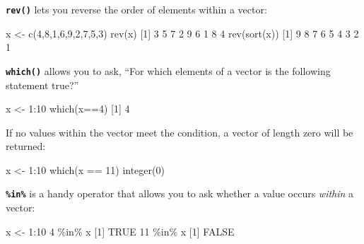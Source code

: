 \documentclass[
]{book}
\newenvironment{Shaded}{\begin{snugshade}}{\end{snugshade}}
\newcommand{\ConstantTok}[1]{\textcolor[rgb]{0.00,0.00,0.00}{#1}}
\newcommand{\DecValTok}[1]{\textcolor[rgb]{0.00,0.00,0.81}{#1}}
\newcommand{\FunctionTok}[1]{\textcolor[rgb]{0.00,0.00,0.00}{#1}}
\newcommand{\NormalTok}[1]{#1}
\newcommand{\OtherTok}[1]{\textcolor[rgb]{0.56,0.35,0.01}{#1}}
\newcommand{\SpecialCharTok}[1]{\textcolor[rgb]{0.00,0.00,0.00}{#1}}
\begin{document}
\textbf{\texttt{rev()}} lets you reverse the order of elements within a vector:

\begin{Shaded}
\begin{Highlighting}[]
\NormalTok{x }\OtherTok{\textless{}{-}} \FunctionTok{c}\NormalTok{(}\DecValTok{4}\NormalTok{,}\DecValTok{8}\NormalTok{,}\DecValTok{1}\NormalTok{,}\DecValTok{6}\NormalTok{,}\DecValTok{9}\NormalTok{,}\DecValTok{2}\NormalTok{,}\DecValTok{7}\NormalTok{,}\DecValTok{5}\NormalTok{,}\DecValTok{3}\NormalTok{)}
\FunctionTok{rev}\NormalTok{(x)}
\NormalTok{[}\DecValTok{1}\NormalTok{] }\DecValTok{3} \DecValTok{5} \DecValTok{7} \DecValTok{2} \DecValTok{9} \DecValTok{6} \DecValTok{1} \DecValTok{8} \DecValTok{4}
\FunctionTok{rev}\NormalTok{(}\FunctionTok{sort}\NormalTok{(x))}
\NormalTok{[}\DecValTok{1}\NormalTok{] }\DecValTok{9} \DecValTok{8} \DecValTok{7} \DecValTok{6} \DecValTok{5} \DecValTok{4} \DecValTok{3} \DecValTok{2} \DecValTok{1}
\end{Highlighting}
\end{Shaded}

\textbf{\texttt{which()}} allows you to ask, ``For which elements of a vector is the following statement true?''

\begin{Shaded}
\begin{Highlighting}[]
\NormalTok{x }\OtherTok{\textless{}{-}} \DecValTok{1}\SpecialCharTok{:}\DecValTok{10}
\FunctionTok{which}\NormalTok{(x}\SpecialCharTok{==}\DecValTok{4}\NormalTok{)}
\NormalTok{[}\DecValTok{1}\NormalTok{] }\DecValTok{4}
\end{Highlighting}
\end{Shaded}

If no values within the vector meet the condition, a vector of length zero will be returned:

\begin{Shaded}
\begin{Highlighting}[]
\NormalTok{x }\OtherTok{\textless{}{-}} \DecValTok{1}\SpecialCharTok{:}\DecValTok{10}
\FunctionTok{which}\NormalTok{(x }\SpecialCharTok{==} \DecValTok{11}\NormalTok{)}
\FunctionTok{integer}\NormalTok{(}\DecValTok{0}\NormalTok{)}
\end{Highlighting}
\end{Shaded}

\textbf{\texttt{\%in\%}} is a handy operator that allows you to ask whether a value occurs \emph{within} a vector:

\begin{Shaded}
\begin{Highlighting}[]
\NormalTok{x }\OtherTok{\textless{}{-}} \DecValTok{1}\SpecialCharTok{:}\DecValTok{10}
\DecValTok{4} \SpecialCharTok{\%in\%}\NormalTok{ x}
\NormalTok{[}\DecValTok{1}\NormalTok{] }\ConstantTok{TRUE}
\DecValTok{11} \SpecialCharTok{\%in\%}\NormalTok{ x}
\NormalTok{[}\DecValTok{1}\NormalTok{] }\ConstantTok{FALSE}
\end{Highlighting}
\end{Shaded}
\end{document}
